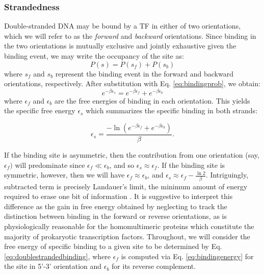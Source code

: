 \documentclass{article}
\begin{document}
\subsubsection{Strandedness}
Double-stranded DNA may be bound by a TF in either of two
orientations, which we will refer to as the \textit{forward} and
\textit{backward} orientations.  Since binding in the two orientations
is mutually exclusive and jointly exhaustive given the binding event,
we may write the occupancy of the site as:
\begin{equation}
P(s) = P(s_f) + P(s_b)
\end{equation}
where $s_f$ and $s_b$ represent the binding event in the forward and backward orientations, respectively.  After substitution with Eq. \ref{eq:bindingprob}, we obtain:
$$e^{-\beta \epsilon_s} = e^{-\beta \epsilon_f} + e^{-\beta \epsilon_b}$$
where $\epsilon_f$ and $\epsilon_b$ are the free energies of binding in
each orientation.  This yields the specific free energy
$\epsilon_s$ which summarizes the specific binding in both strands:

\begin{equation}
\label{eq:doublestrandedbinding}
\epsilon_s = \frac{-\ln(e^{-\beta \epsilon_f} + e^{-\beta \epsilon_b})}{\beta}.
\end{equation}

If the binding site is asymmetric, then the contribution from one
orientation (say, $\epsilon_f)$ will predominate since $\epsilon_f \ll
\epsilon_b$, and so $\epsilon_s \approx \epsilon_f$.  If the binding
site is symmetric, however, then we will have $\epsilon_f \approx
\epsilon_b$, and $\epsilon_s \approx \epsilon_f - \frac{\ln
  2}{\beta}$.  Intriguingly, subtracted term is precisely Landauer's
limit, the minimum amount of energy required to erase one bit of
information  \cite{landauer61}. It is suggestive to interpret this
difference as the gain in free energy obtained by neglecting to track
the distinction between binding in the forward or reverse
orientations, as is physiologically reasonable for the homomultimeric
proteins which constitute the majority of prokaryotic transcription
factors.  Throughout, we will consider the free energy of specific
binding to a given site to be determined by
Eq. \ref{eq:doublestrandedbinding}, where $\epsilon_f$ is computed via
Eq. \ref{eq:bindingenergy} for the site in 5'-3' orientation and
$\epsilon_b$ for its reverse complement.
\end{document}
